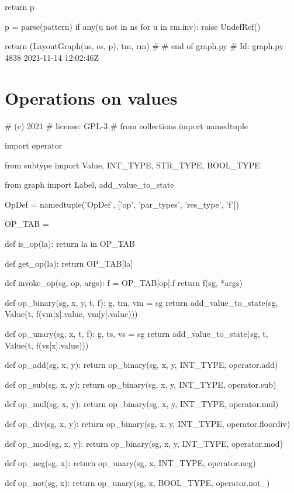 \begin{dispPy}
        return p

    p = parse(pattern)
    if any(u not in ns for u in rm.inv):
        raise UndefRef()

    return (LayoutGraph(ns, es, p), tm, rm)
#
# end of graph.py
# Id: graph.py 4838 2021-11-14 12:02:46Z 
\end{dispPy}

\section{Operations on values}

\begin{dispPy}
#    (c) 2021 
#    license:          GPL-3
#
from collections import namedtuple

import operator

from subtype import Value, INT_TYPE, STR_TYPE, BOOL_TYPE

from graph import Label, add_value_to_state

OpDef = namedtuple('OpDef', ['op', 'par_types', 'res_type', 'f'])

OP_TAB = {}

def is_op(la):
    return la in OP_TAB

def get_op(la):
    return OP_TAB[la]

def invoke_op(sg, op, args):
    f = OP_TAB[op].f
    return f(sg, *args)

def op_binary(sg, x, y, t, f):
    g, tm, vm = sg
    return add_value_to_state(sg, Value(t, f(vm[x].value, vm[y].value)))

def op_unary(sg, x, t, f):
    g, ts, vs = sg
    return add_value_to_state(sg, t, Value(t, f(vs[x].value)))

def op_add(sg, x, y):
    return op_binary(sg, x, y, INT_TYPE, operator.add)

def op_sub(sg, x, y):
    return op_binary(sg, x, y, INT_TYPE, operator.sub)

def op_mul(sg, x, y):
    return op_binary(sg, x, y, INT_TYPE, operator.mul)

def op_div(sg, x, y):
    return op_binary(sg, x, y, INT_TYPE, operator.floordiv)

def op_mod(sg, x, y):
    return op_binary(sg, x, y, INT_TYPE, operator.mod)

def op_neg(sg, x):
    return op_unary(sg, x, INT_TYPE, operator.neg)

def op_not(sg, x):
    return op_unary(sg, x, BOOL_TYPE, operator.not_)


\end{dispPy}
